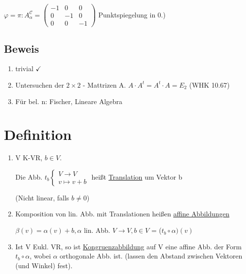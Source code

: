 \documentclass[a4paper, openany]{book}
\begin{document}
        $\varphi = \pi: A_{\alpha}^{\mathcal{C}} = \begin{pmatrix}-1 & 0 & 0 \\ 0 & -1 & 0 \\ 0 & 0 & -1 \end{pmatrix}$ Punktspiegelung in 0.)


        \subsection{Beweis}

        \begin{enumerate}[label=(\alph*)]
          \item trivial $\checkmark$

          \item Untersuchen der $2 \times 2$ - Mattrizen A. $A \cdot A^t = A^t \cdot A = E_2$ (WHK 10.67)

          \item Für bel. n: Fischer, Lineare Algebra

        \end{enumerate}


        \section{Definition}

        \begin{enumerate}[label=(\alph*)]
          \item V K-VR, $b \in V$.

          Die Abb. $t_b \begin{cases}V \rightarrow V \\ v \mapsto v+b \end{cases}$ heißt \underline{Translation} um Vektor b

          (Nicht linear, falls $b \neq 0$)

          \item Komposition von lin. Abb. mit Translationen heißen \underline{affine Abbildungen}

          \par \medskip

          $\beta(v) = \alpha(v) + b,  \alpha$ lin. Abb. $V \rightarrow V, b \in V$ = ($t_b \circ \alpha) (v)$

          \item Ist V Eukl. VR, so ist \underline{Kongruenzabbildung} auf V eine affine Abb. der Form $t_b \circ \alpha$, wobei $\alpha$ orthogonale Abb. ist. (lassen den Abstand zwischen Vektoren (und Winkel) fest).

        \end{enumerate}
\end{document}
